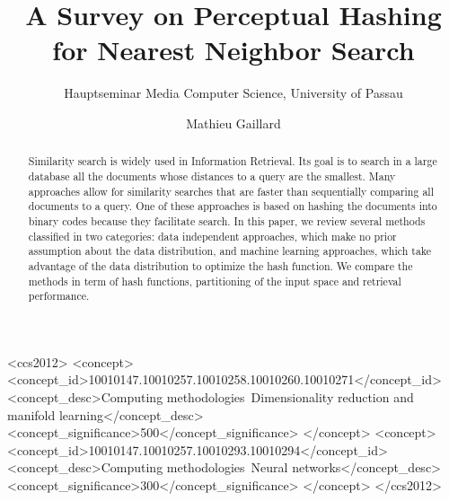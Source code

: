 \documentclass[sigconf]{acmart}
\begin{document}
\title{A Survey on Perceptual Hashing for Nearest Neighbor Search}
\subtitle{Hauptseminar Media Computer Science, University of Passau}

\author{Mathieu Gaillard}

\begin{abstract}
Similarity search is widely used in Information Retrieval. Its goal is to search in a large database all the documents whose distances to a query are the smallest. Many approaches allow for similarity searches that are faster than sequentially comparing all documents to a query. One of these approaches is based on hashing the documents into binary codes because they facilitate search. In this paper, we review several methods classified in two categories: data independent approaches, which make no prior assumption about the data distribution, and machine learning approaches, which take advantage of the data distribution to optimize the hash function. We compare the methods in term of hash functions, partitioning of the input space and retrieval performance.
\end{abstract}

%
%
\begin{CCSXML}
<ccs2012>
	<concept>
		<concept_id>10010147.10010257.10010258.10010260.10010271</concept_id>
		<concept_desc>Computing methodologies~Dimensionality reduction and manifold learning</concept_desc>
		<concept_significance>500</concept_significance>
	</concept>
	<concept>
		<concept_id>10010147.10010257.10010293.10010294</concept_id>
		<concept_desc>Computing methodologies~Neural networks</concept_desc>
		<concept_significance>300</concept_significance>
	</concept>
</ccs2012>
\end{CCSXML}



\maketitle




 
\end{document}
